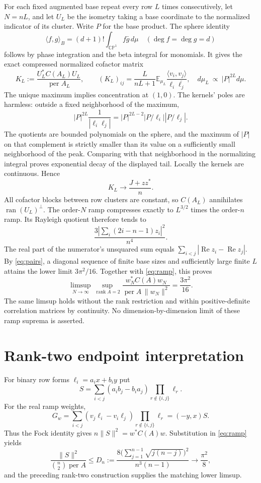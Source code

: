 \documentclass[11pt]{article}
\DeclareMathOperator{\per}{per}
\DeclareMathOperator{\rank}{rank}
\DeclareMathOperator{\Ree}{Re}
\newcommand{\CP}{\mathbb {CP}}
\begin{document}
For each fixed augmented base repeat every row $L$ times consecutively, let
$N=nL$, and let $U_L$ be the isometry taking a base coordinate to the normalized
indicator of its cluster. Write $P$ for the base product. The sphere identity
\[
 \langle f,g\rangle_B=(d+1)!\int_{\CP^1}f\bar g\,d\mu
 \quad(\deg f=\deg g=d)
\]
follows by phase integration and the beta integral for monomials. It gives the
exact compressed normalized cofactor matrix
\[
 K_L:=\frac{U_L^*C(A_L)U_L}{\per A_L},\qquad
 (K_L)_{ij}=\frac{L}{nL+1}\mathbb E_{\mu_L}
       \frac{\langle v_i,v_j\rangle}{\ell_i\overline{\ell_j}},
 \quad d\mu_L\ \propto\ |P|^{2L}d\mu.
\]
The unique maximum implies concentration at $(1,0)$. The kernels' poles are
harmless: outside a fixed neighborhood of the maximum,
\[
 |P|^{2L}\frac1{|\ell_i\ell_j|}
 =|P|^{2L-2}|P/\ell_i||P/\ell_j|.
\]
The quotients are bounded polynomials on the sphere, and the maximum of
$|P|$ on that complement is strictly smaller than its value on a sufficiently
small neighborhood of the peak. Comparing with that neighborhood in the
normalizing integral proves exponential decay of the displayed tail. Locally
the kernels are continuous. Hence
\[
 K_L\longrightarrow\frac{J+zz^*}{n}.
\]
All cofactor blocks between row clusters are constant, so $C(A_L)$ annihilates
$\operatorname{ran}(U_L)^\perp$. The order-$N$ ramp compresses exactly to
$L^{3/2}$ times the order-$n$ ramp. Its Rayleigh quotient therefore tends to
\[
 \frac{3|\sum_i(2i-n-1)z_i|^2}{n^4}.
\]
The real part of the numerator's unsquared sum equals
$\sum_{i<j}|\Ree z_i-\Ree z_j|$. By \eqref{eq:pairs}, a diagonal sequence of
finite base sizes and sufficiently large finite $L$ attains the lower limit
$3\pi^2/16$. Together with \eqref{eq:ramp}, this proves
\[
 \limsup_{N\to\infty}\sup_{\rank A=2}
 \frac{w_N^*C(A)w_N}{\per A\,\|w_N\|^2}=\frac{3\pi^2}{16}.
\]
The same limsup holds without the rank restriction and within positive-definite
correlation matrices by continuity. No dimension-by-dimension limit of these
ramp suprema is asserted.

\section{Rank-two endpoint interpretation}
For binary row forms $\ell_i=a_ix+b_iy$ put
\[
 S=\sum_{i<j}(a_ib_j-b_ia_j)\prod_{r\notin\{i,j\}}\ell_r.
\]
For the real ramp weights,
\[
 G_w=\sum_{i<j}(v_j\ell_i-v_i\ell_j)
                \prod_{r\notin\{i,j\}}\ell_r=(-y,x)S.
\]
Thus the Fock identity gives
$n\|S\|^2=w^*C(A)w$. Substitution in \eqref{eq:ramp} yields
\[
 \frac{\|S\|^2}{\binom n2\per A}
 \le D_n:=\frac{8\bigl(\sum_{j=1}^{n-1}\sqrt{j(n-j)}\bigr)^2}
                 {n^3(n-1)}\longrightarrow\frac{\pi^2}{8},
\]
and the preceding rank-two construction supplies the matching lower limsup.
\end{document}
